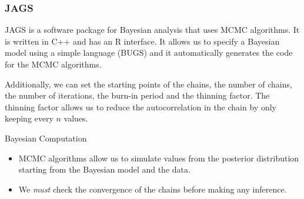 \subsubsection{JAGS}

JAGS is a software package for Bayesian analysis that uses MCMC algorithms.
It is written in C++ and has an R interface.
It allows us to specify a Bayesian model using a simple language (BUGS) and
it automatically generates the code for the MCMC algorithms.

Additionally, we can set the starting points of the chains, the number of chains,
the number of iterations, the burn-in period and the thinning factor.
The thinning factor allows us to reduce the autocorrelation in the chain
by only keeping every $n$ values.

\begin{recap}{Bayesian Computation}{}
	\begin{itemize}
		\item MCMC algorithms allow us to simulate values from the posterior distribution
		      starting from the Bayesian model and the data.
		\item We \emph{must} check the convergence of the chains before making any inference.
	\end{itemize}
\end{recap}



